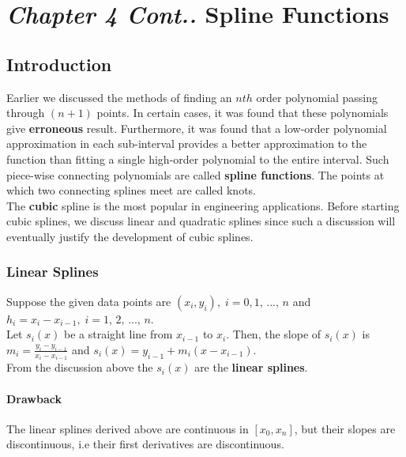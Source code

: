\documentclass[aima203_lecturenotes_ku.tex]{subfiles}
\begin{document}
\chapter*{\textit{Chapter 4 Cont..} \hspace{15mm}  Spline Functions}
\section{Introduction}
Earlier we discussed the methods of finding an $nth$ order polynomial passing through $(n+1)$ points. In certain cases, it was found that these polynomials give \textbf{erroneous} result. Furthermore, it was found that a low-order polynomial approximation in each sub-interval provides a better approximation to the function than fitting a single high-order polynomial to the entire interval.
Such piece-wise connecting polynomials are called \textbf{spline functions}. The points at which two connecting splines meet are called knots.\\
The \textbf{cubic} spline is the most popular in engineering applications. Before starting cubic splines, we discuss linear and quadratic splines since such a discussion will eventually justify the development of cubic splines.

\subsection{Linear Splines}
Suppose the given data points are $(x_i,y_i), \; i=0,1,\, ..., \, n$ and  $h_i = x_i-x_{i-1} , \; i=1,\, 2, \, ..., \, n$. \\
Let $s_i(x)$ be a straight line from $x_{i-1}$ to $x_i$. Then, the slope of $s_i(x)$ is \\
$\displaystyle m_i = \frac{y_i - y_{i-1}}{x_i - x_{i-1}}$ and $s_i(x)= y_{i-1} + m_i(x-x_{i-1})$. \\[2mm]
From the discussion above the $s_i(x)$ are the \textbf{linear splines}.

\subsubsection{Drawback}
The linear splines derived above are continuous in $[x_0, x_n]$, but their slopes are discontinuous, i.e their first derivatives are discontinuous.
\end{document}
